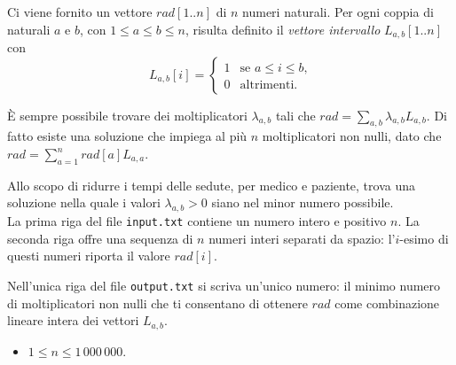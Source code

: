 \renewcommand{\nomebreve}{collimator}
\renewcommand{\titolo}{Collimatore a foglia per radioterapia}

\introduzione{}
Ci viene fornito un vettore $rad[1..n]$ di $n$ numeri naturali.
Per ogni coppia di naturali $a$ e $b$, con $1\leq a \leq b \leq n$,
risulta definito il \emph{vettore intervallo} $L_{a,b}[1..n]$ con
\[
L_{a,b}[i] = \left\{
               \begin{array}{ll}
                 1 & \mbox{se $a\leq i \leq b$,}\\
                 0 & \mbox{altrimenti.}
               \end{array}
            \right.
\]

\`E sempre possibile trovare dei moltiplicatori $\lambda_{a,b}$           
 tali che $rad = \sum_{a,b} \lambda_{a,b} L_{a,b}$.
 Di fatto esiste una soluzione che impiega al pi\`u $n$ moltiplicatori non nulli, dato che $rad = \sum_{a=1}^n rad[a] L_{a,a}$.
            
  Allo scopo di ridurre i tempi delle sedute, per medico e paziente, trova una soluzione nella quale i valori $\lambda_{a,b} > 0$ siano nel minor numero possibile.\\


La prima riga del file \verb'input.txt' contiene un numero intero e positivo $n$.
La seconda riga offre una sequenza di $n$ numeri interi separati da spazio:
l'$i$-esimo di questi numeri riporta il valore $rad[i]$.

Nell'unica riga del file \verb'output.txt' si scriva un'unico numero:
il minimo numero di moltiplicatori non nulli che ti consentano di ottenere $rad$
come combinazione lineare intera dei vettori $L_{a,b}$.\\



\begin{itemize}[nolistsep, noitemsep]
  \item $1 \le n \le 1\,000\,000$.
\end{itemize}
  
